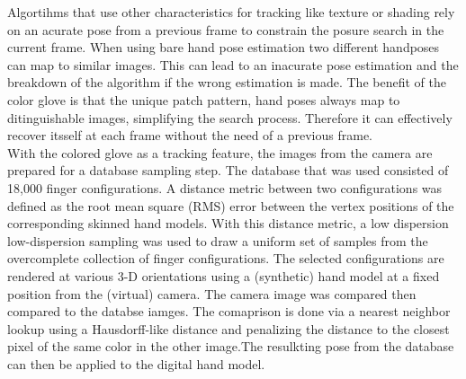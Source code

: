 Algortihms that use other characteristics for tracking like texture or shading \cite{LaGorce.2008} rely on an acurate pose from a previous frame to constrain the posure search in the current frame. When using bare hand pose estimation two different handposes can map to similar images. This can lead to an inacurate pose estimation and the breakdown of the algorithm if the wrong estimation is made.
The benefit of the color glove is that the unique patch pattern, hand poses always map to ditinguishable images, simplifying the search process. Therefore it can effectively recover itsself at each frame without the need of a previous frame.\\
With the colored glove as a tracking feature, the images from the camera are prepared for a database sampling step. The database that was used consisted of 18,000 finger configurations. A distance metric between two configurations was defined as the root mean square (RMS) error between the vertex positions of the corresponding skinned hand models. With this distance metric, a low dispersion low-dispersion sampling was used to draw a uniform set of samples from the overcomplete collection of finger configurations.
The selected configurations are rendered at various 3-D orientations using a (synthetic) hand model at a fixed position from the (virtual) camera.
The camera image was compared then compared to the databse iamges. The comaprison is done via a nearest neighbor lookup using a Hausdorff-like distance \cite{Huttenlocher.1993} and penalizing the distance to the closest pixel of the same color in the other image.The resulkting pose from the database can then be applied to the digital hand model.

